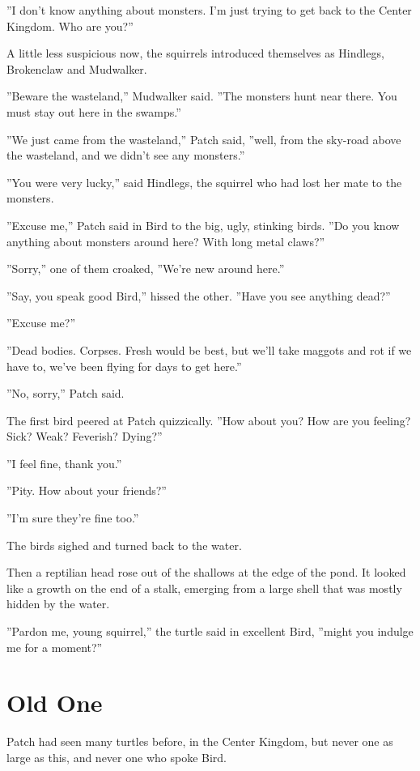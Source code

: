 \documentclass[12pt]{book}
\begin{document}
''I don't know anything about monsters. I'm just trying to get back to
the Center Kingdom. Who are you?''

A little less suspicious now, the squirrels introduced themselves as
Hindlegs, Brokenclaw and Mudwalker.

''Beware the wasteland,'' Mudwalker said. ''The monsters hunt near
there. You must stay out here in the swamps.''

''We just came from the wasteland,'' Patch said, ''well, from the
sky-road above the wasteland, and we didn't see any monsters.''

''You were very lucky,'' said Hindlegs, the squirrel who had lost her
mate to the monsters.

''Excuse me,'' Patch said in Bird to the big, ugly, stinking
birds. ''Do you know anything about monsters around here? With long
metal claws?''

''Sorry,'' one of them croaked, ''We're new around here.''

''Say, you speak good Bird,'' hissed the other. ''Have you see
anything dead?''

''Excuse me?''

''Dead bodies. Corpses. Fresh would be best, but we'll take maggots
and rot if we have to, we've been flying for days to get here.''

''No, sorry,'' Patch said.

The first bird peered at Patch quizzically. ''How about you? How are
you feeling? Sick? Weak? Feverish? Dying?''

''I feel fine, thank you.''

''Pity. How about your friends?''

''I'm sure they're fine too.''

The birds sighed and turned back to the water.

Then a reptilian head rose out of the shallows at the edge of the
pond. It looked like a growth on the end of a stalk, emerging from a
large shell that was mostly hidden by the water.

''Pardon me, young squirrel,'' the turtle said in excellent Bird,
''might you indulge me for a moment?''


\section{Old One}

Patch had seen many turtles before, in the Center Kingdom, but never
one as large as this, and never one who spoke Bird.
\end{document}
